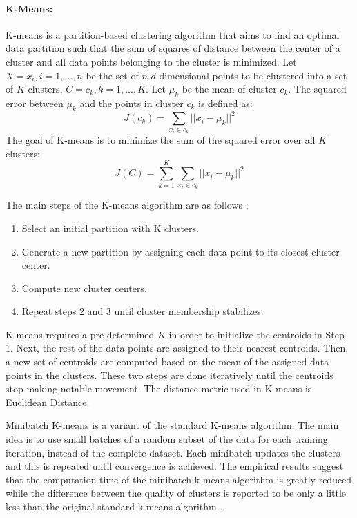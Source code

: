 \paragraph{K-Means:} K-means is a partition-based clustering algorithm that aims to find an optimal data partition such that the sum of squares of distance between the center of a cluster and all data points belonging to the cluster is minimized. Let $X ={x_i}, i = 1, ... , n$ be the set of $n$ $d$-dimensional points to be clustered into a set of $K$ clusters, $C = {c_k}, k =1, ... , K$. Let $\mu_k$ be the mean of cluster $c_k$. The squared error between $\mu_k$ and the points in cluster $c_k$ is defined as: 
\[J(c_k) = \sum_{x_i \in c_k} ||x_i - \mu_k||^2 \]
The goal of K-means is to minimize the sum of the squared error over all $K$ clusters: 
\[J(C) = \sum_{k=1}^{K} \sum_{x_i \in c_k} ||x_i - \mu_k||^2 \]

The main steps of the K-means algorithm are as follows \cite{Jain2010}: 
\begin{enumerate}
  	\item Select an initial partition with K clusters. 
	\item Generate a new partition by assigning each data point to its closest cluster center. 
	\item Compute new cluster centers.
	\item Repeat steps 2 and 3 until cluster membership stabilizes.
\end{enumerate}

K-means requires a pre-determined $K$ in order to initialize the centroids in Step 1. Next, the rest of the data points are assigned to their nearest centroids. Then, a new set of centroids are computed based on the mean of the assigned data points in the clusters. These two steps are done iteratively until the centroids stop making notable movement. The distance metric used in K-means is Euclidean Distance. 

Minibatch K-means is a variant of the standard K-means algorithm. The main idea is to use small batches of a random subset of the data for each training iteration, instead of the complete dataset. Each minibatch updates the clusters and this is repeated until convergence is achieved. The empirical results suggest that the computation time of the minibatch k-means algorithm is greatly reduced while the difference between the quality of clusters is reported to be only a little less than the original standard k-means algorithm \cite{miniKmeans2013}.


